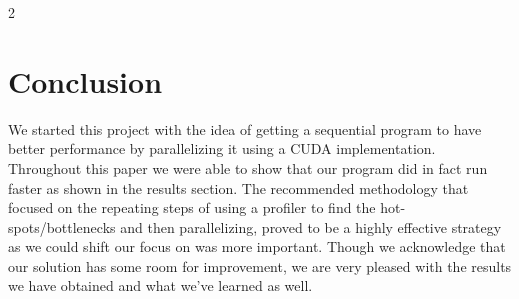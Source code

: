 \documentclass[10pt,journal,compsoc]{IEEEtran}
\begin{document}
\begin{multicols}{2}
\section{Conclusion}
We started this project with the idea of getting a sequential program to have better performance by parallelizing it using a CUDA implementation. Throughout this paper we were able to show that our program did in fact run faster as shown in the results section. The recommended methodology that focused on the repeating steps of using a profiler to find the hot-spots/bottlenecks and then parallelizing, proved to be a highly effective strategy as we could shift our focus on was more important. %
Though we acknowledge that our solution has some room for improvement, we are very pleased with the results we have obtained
and what we've learned as well.




%








\end{multicols}
\end{document}
